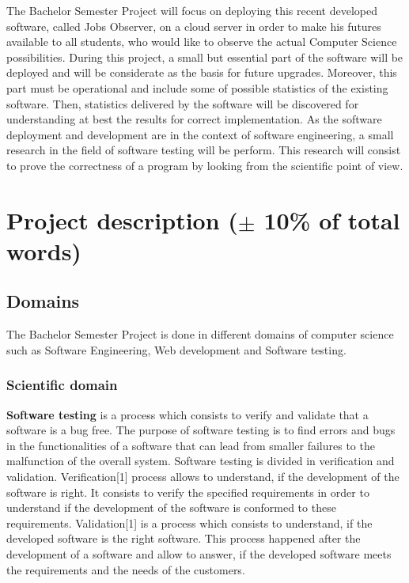 \documentclass[conference,compsoc]{IEEEtran}
\begin{document}
The Bachelor Semester Project will focus on deploying this recent developed software, called Jobs Observer, on a cloud server in order to make his futures available to all students, who would like to observe the actual Computer Science possibilities.                                                                                                                                   
During this project, a small but essential part of the software will be deployed and will be considerate as the basis for future upgrades. Moreover, this part must be operational and include some of possible statistics of the existing software. Then, statistics delivered by the software will be discovered for understanding at best the results for correct implementation.                                                        
As the software deployment and development are in the context of software engineering, a small research in the field of software testing will be perform. This research will consist to prove the correctness of a program by looking from the scientific point of view. 

\section{Project description ($\pm$ 10\% of total words) }
\subsection{Domains}
The Bachelor Semester Project is done in different domains of computer science such as Software Engineering, Web development and Software testing. 

\subsubsection{Scientific domain \newline\newline}

\textbf{Software testing} is a process which consists to verify and validate that a software is a bug free. The purpose of software testing is to find errors and bugs in the functionalities of a software that can lead from smaller failures to the malfunction of the overall system. Software testing is divided in verification and validation.                                                                                                                             Verification[1] process allows to understand, if the development of the software is right. It consists to verify the specified requirements in order to understand if the development of the software is conformed to these requirements.                                                                                                                           Validation[1] is a process which consists to understand, if the developed software is the right software. This process happened after the development of a software and allow to answer, if the developed software meets the requirements and the needs of the customers. 
                                              
\end{document}
